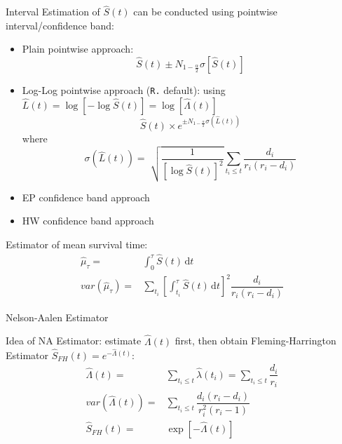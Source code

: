 Interval Estimation of $ \hat{S}(t) $ can be conducted using pointwise interval/confidence band:
\begin{itemize}[topsep=2pt,itemsep=0pt]
    \item Plain pointwise approach:
    \begin{equation}
        \hat{S}(t)\pm N_{1-\frac{\alpha }{2}}\sigma [\hat{S}(t)] 
    \end{equation}
    \item Log-Log pointwise approach (\lstinline|R.| default): using $ \hat{L}(t)=\log\left[-\log \hat{S}(t)\right]=\log\left[\hat{\Lambda }(t)\right] $
    \begin{equation}
         \hat{S}(t)\times e^{\pm N_{1-\frac{\alpha }{2}}\sigma (\hat{L }(t))}
    \end{equation}
    where 
    \begin{equation}
        \sigma (\hat{L }(t))=\sqrt[]{\dfrac{1}{[\log \hat{S}(t)]^2}} \sum_{t_i\leq t}\dfrac{d_i}{r_i(r_i-d_i)}
    \end{equation}
    \item EP confidence band approach
    \item HW confidence band approach
\end{itemize}

Estimator of mean survival time:
\begin{align}
    \hat{\mu }_\tau=&\int _0^\tau \hat{S}(t) \,\mathrm{d}t\\
    var(\hat{\mu }_\tau)=&\sum_{t_i}\left[\int _{t_i}^\tau \hat{S}(t) \,\mathrm{d}t\right]^2\dfrac{d_i}{r_i(r_i-d_i)}
\end{align}
    
\begin{point}
    Nelson-Aalen Estimator
\end{point}

Idea of NA Estimator: estimate $ \hat{\Lambda }(t) $ first, then obtain Fleming-Harrington Estimator $ \hat{S}_{FH}(t)=e^{-\hat{\Lambda }(t)} $:
\begin{align}
    \hat{\Lambda }(t)=&\sum_{t_i\leq t}\hat{\lambda }(t_i)=\sum_{t_i\leq t}\dfrac{d_i}{r_i}\\
    var(\hat{\Lambda }(t))=&\sum_{t_i\leq t}\dfrac{d_i(r_i-d_i)}{r_i^2(r_i-1)}\\
    \hat{S}_{FH}(t)=&\exp\left[ -\hat{\Lambda }(t) \right]
\end{align}

